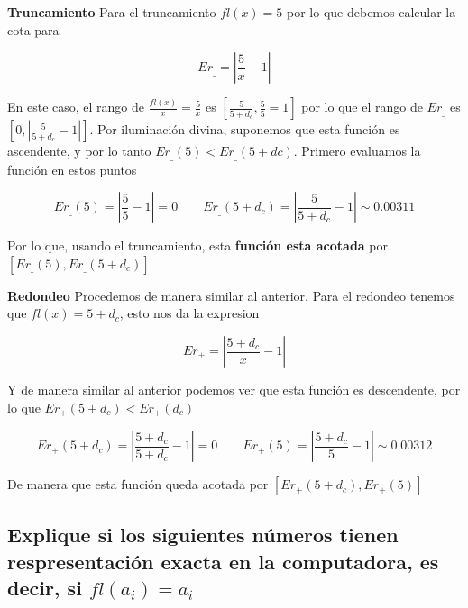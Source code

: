 \documentclass[11pt]{article}
\begin{document}
    \textbf{Truncamiento} Para el truncamiento \(fl(x) = 5\) por lo que
debemos calcular la cota para

\begin{equation*} Er_\_ = \left| \frac{5}{x} - 1 \right|
\end{equation*}

En este caso, el rango de \(\frac{fl(x)}{x} = \frac{5}{x}\) es
\(\left[ \frac{5}{5+d_c}, \frac{5}{5}=1 \right]\) por lo que el rango de
\(Er_\_\) es \(\left[ 0, |\frac{5}{5+d_c}-1| \right]\). Por iluminación
divina, suponemos que esta función es ascendente, y por lo tanto
\(Er_\_(5) < Er_\_(5+dc)\). Primero evaluamos la función en estos puntos

\begin{equation*} Er_\_(5) = \left|\frac{5}{5} -1\right| = 0 \quad\quad Er_\_(5+d_c) = \left|\frac{5}{5+d_c} -1 \right| \sim 0.00311
\end{equation*}

Por lo que, usando el truncamiento, esta \textbf{función esta acotada}
por \(\left[ Er_\_(5), Er_\_(5+d_c) \right]\)

    \textbf{Redondeo} Procedemos de manera similar al anterior. Para el
redondeo tenemos que \(fl(x) = 5+d_c\), esto nos da la expresion

\begin{equation*} Er_+ = \left| \frac{5+d_c}{x} - 1 \right|
\end{equation*}

Y de manera similar al anterior podemos ver que esta función es
descendente, por lo que \(Er_+(5+d_c) < Er_+(d_c)\)

\begin{equation*} Er_+(5+d_c) = \left| \frac{5+d_c}{5+d_c} -1 \right| = 0 \quad\quad Er_+(5) = \left| \frac{5+d_c}{5} -1 \right| \sim 0.00312
\end{equation*}

De manera que esta función queda acotada por
\(\left[ Er_+(5+d_c),Er_+(5) \right]\)

    \hypertarget{explique-si-los-siguientes-nuxfameros-tienen-respresentaciuxf3n-exacta-en-la-computadora-es-decir-si-fla_ia_i}{%
\subsection{\texorpdfstring{Explique si los siguientes números tienen
respresentación exacta en la computadora, es decir, si
\(fl(a_i)=a_i\)}{Explique si los siguientes números tienen respresentación exacta en la computadora, es decir, si fl(a\_i)=a\_i}}\label{explique-si-los-siguientes-nuxfameros-tienen-respresentaciuxf3n-exacta-en-la-computadora-es-decir-si-fla_ia_i}}
\end{document}
